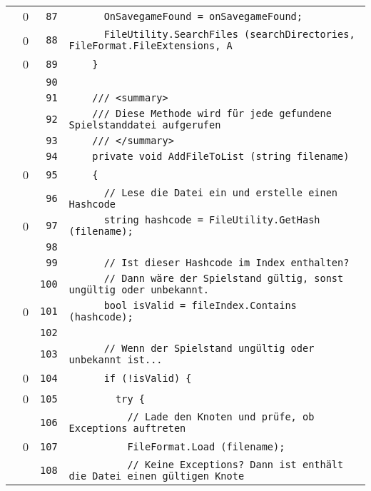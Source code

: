 \documentclass[a4paper,10pt]{article}
\begin{document}
\begin{longtable}[l]{lrrl}
\cellcolor{red} & 0 & \verb~87~ & \verb~      OnSavegameFound = onSavegameFound;~\\
\cellcolor{red} & 0 & \verb~88~ & \verb~      FileUtility.SearchFiles (searchDirectories, FileFormat.FileExtensions, A~\\
\cellcolor{red} & 0 & \verb~89~ & \verb~    }~\\
\cellcolor{gray} &  & \verb~90~ & \verb~~\\
\cellcolor{gray} &  & \verb~91~ & \verb~    /// <summary>~\\
\cellcolor{gray} &  & \verb~92~ & \verb~    /// Diese Methode wird für jede gefundene Spielstanddatei aufgerufen~\\
\cellcolor{gray} &  & \verb~93~ & \verb~    /// </summary>~\\
\cellcolor{gray} &  & \verb~94~ & \verb~    private void AddFileToList (string filename)~\\
\cellcolor{red} & 0 & \verb~95~ & \verb~    {~\\
\cellcolor{gray} &  & \verb~96~ & \verb~      // Lese die Datei ein und erstelle einen Hashcode~\\
\cellcolor{red} & 0 & \verb~97~ & \verb~      string hashcode = FileUtility.GetHash (filename);~\\
\cellcolor{gray} &  & \verb~98~ & \verb~~\\
\cellcolor{gray} &  & \verb~99~ & \verb~      // Ist dieser Hashcode im Index enthalten?~\\
\cellcolor{gray} &  & \verb~100~ & \verb~      // Dann wäre der Spielstand gültig, sonst ungültig oder unbekannt.~\\
\cellcolor{red} & 0 & \verb~101~ & \verb~      bool isValid = fileIndex.Contains (hashcode);~\\
\cellcolor{gray} &  & \verb~102~ & \verb~~\\
\cellcolor{gray} &  & \verb~103~ & \verb~      // Wenn der Spielstand ungültig oder unbekannt ist...~\\
\cellcolor{red} & 0 & \verb~104~ & \verb~      if (!isValid) {~\\
\cellcolor{red} & 0 & \verb~105~ & \verb~        try {~\\
\cellcolor{gray} &  & \verb~106~ & \verb~          // Lade den Knoten und prüfe, ob Exceptions auftreten~\\
\cellcolor{red} & 0 & \verb~107~ & \verb~          FileFormat.Load (filename);~\\
\cellcolor{gray} &  & \verb~108~ & \verb~          // Keine Exceptions? Dann ist enthält die Datei einen gültigen Knote~\\

\end{longtable}
\end{document}
